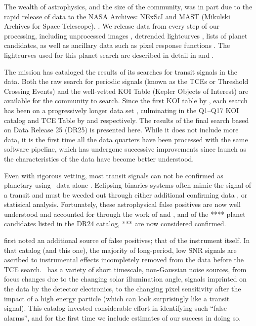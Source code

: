 The wealth of astrophysics, and the size of the \Kepler{} community, was in part due to the rapid release of \Kepler{} data to the NASA Archives: NExScI \citep[NASA Exoplanet Science Institute][]{Acheson14} and MAST (Mikulski Archives for Space Telescope). . We release data from every step of our processing, including unprocessed images \citep{PAref}, detrended lightcurves \citep{Stumpe14}, lists of planet candidates, as well as ancillary data such as pixel response functions \citep{Bryson10} . The lightcurves used for this planet search are described in detail in \citet{DataReleaseNotes25} and \citet{DCH}.

The mission has cataloged the results of its searches for transit signals in the data. Both the raw search for periodic signals (known as the TCEs or Threshold Crossing Events)  and the well-vetted KOI Table (Kepler Objects of Interest) are available for the community to search.  Since the first KOI table by \citet{Borucki2011a}, each search has been on a progressively longer data set \citep{Bathala12, Burke13, Rowe15, Mullally15}, culminating in the Q1--Q17 KOI catalog and TCE Table by \citet{Coughlin2016} and \citet{Seader2015} respectively.  The results of the final search based on Data Release 25 (DR25) is presented here. While it does not include more data, it is the first time all the data quarters have been processed with the same software pipeline, which has undergone successive improvements since launch as the characteristics of the data have become better understood.

Even with rigorous vetting, most transit signals can not be confirmed as planetary using \Kepler\ data alone \citep[the dominant exception being multi-planet systems][]{Lissauer12, Rowe14multi}. Eclipsing binaries systems often mimic the signal of a transit and must be weeded out through either additional confirming data \citep[such as radial velocities, e.g.][]{Marcy14}, or statisical analysis. Fortunately, these astrophysical false positives are now well understood and accounted for through the work of \citet{Torres2012} and \citet{Morton2016}, and of the **** planet candidates listed in the DR24 catalog, *** are now considered confirmed.

\citet{Mullally2015cat} first noted an additional source of false positives; that of the instrument itself. In that catalog (and this one), the majority of long-period, low SNR signals are ascribed to instrumental effects incompletely removed from the data before the TCE search. \Kepler\ has a variety of short timescale, non-Gaussian noise sources, from focus changes due to the changing solar illumination angle, signals imprinted on the data by the detector electronics, to the changing pixel sensitivity after the impact of a high energy particle (which can look surprisingly like a transit signal). This catalog invested considerable effort in identifying such ``false alarms'', and for the first time we include estimates of our success in doing so.

